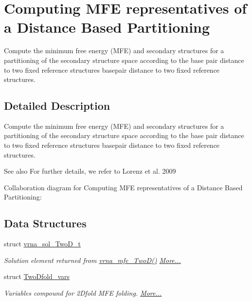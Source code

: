 \hypertarget{group__kl__neighborhood__mfe}{}\section{Computing M\+FE representatives of a Distance Based Partitioning}
\label{group__kl__neighborhood__mfe}


Compute the minimum free energy (M\+FE) and secondary structures for a partitioning of the secondary structure space according to the base pair distance to two fixed reference structures basepair distance to two fixed reference structures.  




\subsection{Detailed Description}
Compute the minimum free energy (M\+FE) and secondary structures for a partitioning of the secondary structure space according to the base pair distance to two fixed reference structures basepair distance to two fixed reference structures. 

\begin{DoxySeeAlso}{See also}
For further details, we refer to Lorenz et al. 2009 \cite{lorenz:2009} 
\end{DoxySeeAlso}
Collaboration diagram for Computing M\+FE representatives of a Distance Based Partitioning\+:
\subsection*{Data Structures}
\begin{DoxyCompactItemize}
\item 
struct \mbox{\hyperlink{group__kl__neighborhood__mfe_structvrna__sol__TwoD__t}{vrna\+\_\+sol\+\_\+\+Two\+D\+\_\+t}}
\begin{DoxyCompactList}\small\item\em Solution element returned from \mbox{\hyperlink{group__kl__neighborhood__mfe_ga243c288b463147352829df04de6a2f77}{vrna\+\_\+mfe\+\_\+\+Two\+D()}}  \mbox{\hyperlink{group__kl__neighborhood__mfe_structvrna__sol__TwoD__t}{More...}}\end{DoxyCompactList}\item 
struct \mbox{\hyperlink{group__kl__neighborhood__mfe_structTwoDfold__vars}{Two\+Dfold\+\_\+vars}}
\begin{DoxyCompactList}\small\item\em Variables compound for 2Dfold M\+FE folding.  \mbox{\hyperlink{group__kl__neighborhood__mfe_structTwoDfold__vars}{More...}}\end{DoxyCompactList}\end{DoxyCompactItemize}
